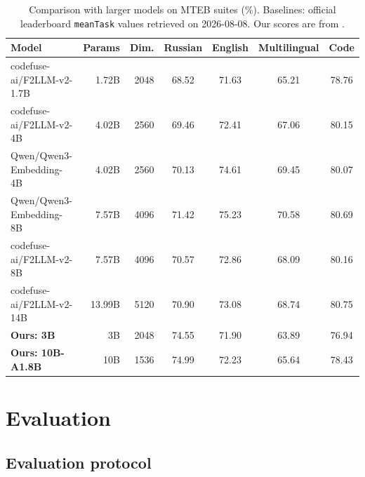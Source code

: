 \documentclass[11pt]{article}
\begin{document}
\begin{table}[!t]
  \caption{Comparison with larger models on MTEB suites (\%). Baselines: official leaderboard \texttt{meanTask} values retrieved on 2026-08-08. Our scores are from .}
  \label{tab:large-baselines}
  \centering
  \small
  \setlength{\tabcolsep}{4.5pt}
  \begin{tabular}{lrrcccc}
    \toprule
    \textbf{Model} & \textbf{Params} & \textbf{Dim.} & \textbf{Russian} & \textbf{English} & \textbf{Multilingual} & \textbf{Code} \\
    \midrule
    codefuse-ai/F2LLM-v2-1.7B                              & 1.72B  & 2048 & 68.52 & 71.63 & 65.21 & 78.76 \\
    codefuse-ai/F2LLM-v2-4B                                & 4.02B  & 2560 & 69.46 & 72.41 & 67.06 & 80.15 \\
    Qwen/Qwen3-Embedding-4B                                & 4.02B  & 2560 & 70.13 & 74.61 & 69.45 & 80.07 \\
    Qwen/Qwen3-Embedding-8B                                & 7.57B  & 4096 & 71.42 & 75.23 & 70.58 & 80.69 \\
    codefuse-ai/F2LLM-v2-8B                                & 7.57B  & 4096 & 70.57 & 72.86 & 68.09 & 80.16 \\
    codefuse-ai/F2LLM-v2-14B                               & 13.99B & 5120 & 70.90 & 73.08 & 68.74 & 80.75 \\
    \midrule
    \textbf{Ours: 3B}                                      & 3B     & 2048 & 74.55 & 71.90 & 63.89 & 76.94 \\
    \textbf{Ours: 10B-A1.8B}                               & 10B    & 1536 & 74.99 & 72.23 & 65.64 & 78.43 \\
    \bottomrule
  \end{tabular}
\end{table}

\section{Evaluation}
\label{sec:evaluation}

\subsection{Evaluation protocol}
\end{document}
